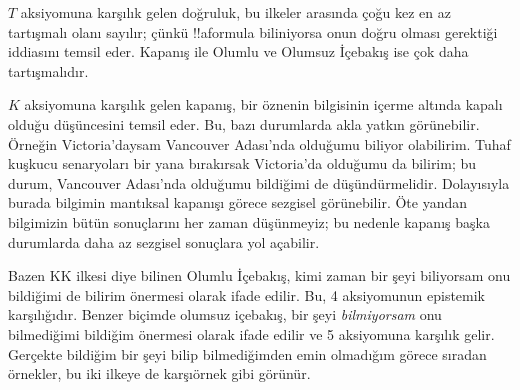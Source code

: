$T$ aksiyomuna karşılık gelen doğruluk, bu ilkeler arasında çoğu kez en az
tartışmalı olanı sayılır; çünkü !!a{formula} biliniyorsa onun doğru olması
gerektiği iddiasını temsil eder. Kapanış ile Olumlu ve Olumsuz İçebakış ise
çok daha tartışmalıdır.

$K$ aksiyomuna karşılık gelen kapanış, bir öznenin bilgisinin içerme altında
kapalı olduğu düşüncesini temsil eder. Bu, bazı durumlarda akla yatkın
görünebilir. Örneğin Victoria'daysam Vancouver Adası'nda olduğumu biliyor
olabilirim. Tuhaf kuşkucu senaryoları bir yana bırakırsak Victoria'da
olduğumu da bilirim; bu durum, Vancouver Adası'nda olduğumu bildiğimi de
düşündürmelidir. Dolayısıyla burada bilgimin mantıksal kapanışı görece
sezgisel görünebilir. Öte yandan bilgimizin bütün sonuçlarını her zaman
düşünmeyiz; bu nedenle kapanış başka durumlarda daha az sezgisel sonuçlara
yol açabilir.

Bazen KK ilkesi diye bilinen Olumlu İçebakış, kimi zaman bir şeyi biliyorsam
onu bildiğimi de bilirim önermesi olarak ifade edilir. Bu, 4 aksiyomunun
epistemik karşılığıdır. Benzer biçimde olumsuz içebakış, bir şeyi
\emph{bilmiyorsam} onu bilmediğimi bildiğim önermesi olarak ifade edilir ve 5
aksiyomuna karşılık gelir. Gerçekte bildiğim bir şeyi bilip bilmediğimden emin
olmadığım görece sıradan örnekler, bu iki ilkeye de karşıörnek gibi görünür.


